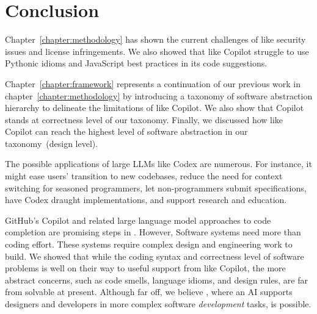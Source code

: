 \section{Conclusion}
\label{conclusion}


Chapter~\ref{chapter:methodology} has shown the current challenges of \cct{} like security issues and license infringements. 
We also showed that \cct{} like Copilot struggle to use Pythonic idioms and JavaScript best practices in its code suggestions.

Chapter~\ref{chapter:framework} represents a continuation of our previous work in chapter~\ref{chapter:methodology} by introducing a taxonomy of software abstraction hierarchy to delineate the limitations of \cct{} like Copilot. We also show that Copilot stands at correctness level of our taxonomy.
Finally, we discussed how \cct{} like Copilot can reach the highest level of software abstraction in our taxonomy~(design level). 

The possible applications of large LLMs like Codex are numerous. 
For instance, it might ease users' transition to new codebases, reduce the need for context switching for seasoned programmers, let non-programmers submit specifications, have Codex draught implementations, and support research and education.

GitHub's Copilot and related large language model approaches to code completion are promising steps in \AISE{}.
However, Software systems need more than coding effort. 
These systems require complex design and engineering work to build. 
We showed that while the coding syntax and correctness level of software problems is well on their way to useful support from \cct{} like Copilot, the more abstract concerns, such as code smells, language idioms, and design rules, are far from solvable at present.
Although far off, we believe \AISE{}, where an AI supports designers and developers in more complex software \emph{development} tasks, is possible.
